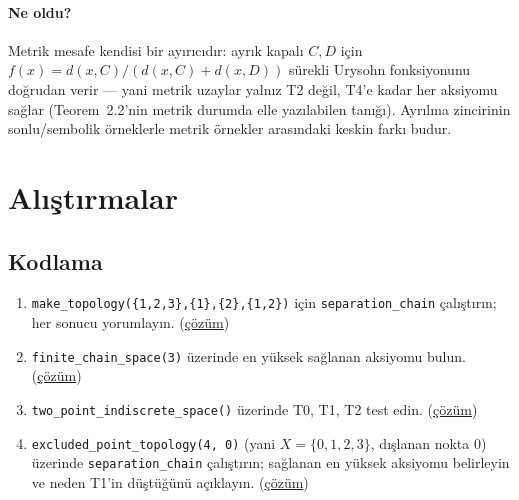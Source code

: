 \paragraph{Ne oldu?}
Metrik mesafe kendisi bir ayırıcıdır: ayrık kapalı $C, D$ için
$f(x) = d(x,C)/(d(x,C)+d(x,D))$ sürekli Urysohn fonksiyonunu doğrudan verir ---
yani metrik uzaylar yalnız T2 değil, T4'e kadar her aksiyomu sağlar
(Teorem~2.2'nin metrik durumda elle yazılabilen tanığı). Ayrılma zincirinin
sonlu/sembolik örneklerle metrik örnekler arasındaki keskin farkı budur.

\section{Alıştırmalar}

\subsection*{Kodlama}
\begin{enumerate}[label=\textbf{K\arabic*.}]
  \item \label{ex:ch06:K1} \texttt{make\_topology(\{1,2,3\},\{1\},\{2\},\{1,2\})}
        için \texttt{separation\_chain} çalıştırın; her sonucu yorumlayın.
        (\hyperref[sol:ch06:K1]{çözüm})

  \item \label{ex:ch06:K2} \texttt{finite\_chain\_space(3)} üzerinde en
        yüksek sağlanan aksiyomu bulun.
        (\hyperref[sol:ch06:K2]{çözüm})

  \item \label{ex:ch06:K3} \texttt{two\_point\_indiscrete\_space()}
        üzerinde T0, T1, T2 test edin.
        (\hyperref[sol:ch06:K3]{çözüm})

  \item \label{ex:ch06:K4} \texttt{excluded\_point\_topology(4, 0)} (yani
        $X=\{0,1,2,3\}$, dışlanan nokta $0$) üzerinde
        \texttt{separation\_chain} çalıştırın; sağlanan en yüksek aksiyomu
        belirleyin ve neden T1'in düştüğünü açıklayın.
        (\hyperref[sol:ch06:K4]{çözüm})
\end{enumerate}

